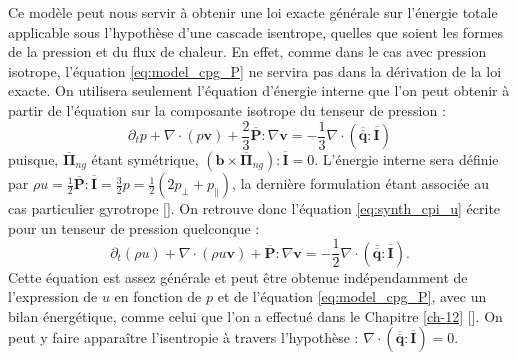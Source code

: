 Ce modèle peut nous servir à obtenir une loi exacte générale sur l'énergie totale applicable sous l'hypothèse d'une cascade isentrope, quelles que soient les formes de la pression et du flux de chaleur. En effet, comme dans le cas avec pression isotrope, l'équation \eqref{eq:model_cpg_P} ne servira pas dans la dérivation de la loi exacte. On utilisera seulement l'équation d'énergie interne que l'on peut obtenir à partir de l'équation sur la composante isotrope du tenseur de pression : 
\begin{equation}
\label{eq:model_cpg_p}     \partial_t p + \nabla \cdot \left(p \boldsymbol{v} \right) + \frac{2}{3} \overline{\boldsymbol{P}} : \nabla \boldsymbol{v}   = - \frac{1}{3} \nabla \cdot \left(\overline{\overline{\boldsymbol{q}}} : \overline{\boldsymbol{I}}\right)
\end{equation}
puisque, $\overline{\boldsymbol{\Pi}}_{ng}$ étant symétrique, $\left(\boldsymbol{b}\times \overline{\boldsymbol{\Pi}}_{ng}\right):\overline{\boldsymbol{I}} = 0$.
L'énergie interne sera définie par $\rho u = \frac{1}{2} \overline{\boldsymbol{P}} : \overline{\boldsymbol{I}} = \frac{3}{2} p = \frac{1}{2} \left(2 p_{\perp} + p_{\parallel} \right) $, la dernière formulation étant associée au cas particulier gyrotrope [\cite{hazeltine_local_2013}].
On retrouve donc l'équation \eqref{eq:synth_cpi_u} écrite pour un tenseur de pression quelconque : 
\begin{equation}
\label{eq:model_cpg_u}     \partial_t \left(\rho u\right) + \nabla \cdot \left(\rho u \boldsymbol{v} \right) +  \overline{\boldsymbol{P}} : \nabla \boldsymbol{v}   = - \frac{1}{2} \nabla \cdot \left(\overline{\overline{\boldsymbol{q}}} : \overline{\boldsymbol{I}}\right) .
\end{equation}
Cette équation est assez générale et peut être obtenue indépendamment de l'expression de $u$ en fonction de $p$ et de l'équation \eqref{eq:model_cpg_P}, avec un bilan énergétique, comme celui que l'on a effectué dans le Chapitre \ref{ch-12} [\cite{eckart_thermodynamics_1940,hazeltine_local_2013}]. On peut y faire apparaître l'isentropie à travers l'hypothèse : $ \nabla \cdot \left(\overline{\overline{\boldsymbol{q}}} : \overline{\boldsymbol{I}}\right) = 0$.  

